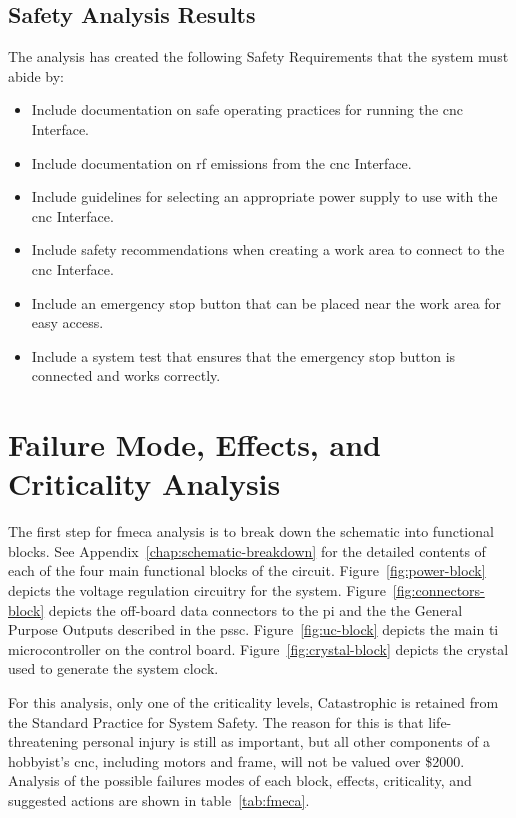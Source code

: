 \subsection{Safety Analysis Results}
The analysis has created the following Safety Requirements that the system must abide by:
\begin{itemize}
	\item Include documentation on safe operating practices for running the \gls{cnc} Interface.
	\item Include documentation on \gls{rf} emissions from the \gls{cnc} Interface.
	\item Include guidelines for selecting an appropriate power supply to use with the \gls{cnc} Interface.
	\item Include safety recommendations when creating a work area to connect to the \gls{cnc} Interface.
	\item Include an emergency stop button that can be placed near the work area for easy access.
	\item Include a system test that ensures that the emergency stop button is connected and works correctly.
\end{itemize}

\section{Failure Mode, Effects, and Criticality Analysis}
The first step for \gls{fmeca} analysis is to break down the schematic into functional blocks. 
See Appendix~\ref{chap:schematic-breakdown} for the detailed contents of each of the four main functional blocks of the circuit.
Figure~\ref{fig:power-block} depicts the voltage regulation circuitry for the system.
Figure~\ref{fig:connectors-block} depicts the off-board data connectors to the \gls{pi} and the the General Purpose Outputs described in the \gls{pssc}.
Figure~\ref{fig:uc-block} depicts the main \gls{ti} microcontroller on the control board.
Figure~\ref{fig:crystal-block} depicts the crystal used to generate the system clock.

For this analysis, only one of the criticality levels, Catastrophic is retained from the Standard Practice for System Safety\cite{mil882d}.
The reason for this is that life-threatening personal injury is still as important, but all other components of a hobbyist's \gls{cnc}, including motors and frame, will not be valued over \$2000.
Analysis of the possible failures modes of each block, effects, criticality, and suggested actions are shown in table~\ref{tab:fmeca}.

